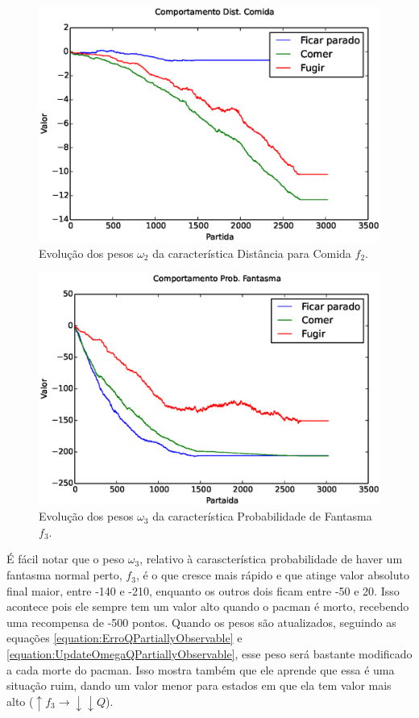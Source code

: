 \begin{figure}[H]
    \centering
    \includegraphics[width=\linewidth]{images/3_behaviors_small_map/weights____pol__DistComida}
    \caption{Evolução dos pesos $ \omega_2 $ da característica Distância para Comida $ f_2 $.}
    \label{img:3ComportamentosMapaPequeno:PesoDistComida}
\end{figure}

\begin{figure}[H]
    \centering
    \includegraphics[width=\linewidth]{images/3_behaviors_small_map/weights____pol__ProbFantasma}
    \caption{Evolução dos pesos $ \omega_3 $ da característica Probabilidade de Fantasma $ f_3 $.}
    \label{img:3ComportamentosMapaPequeno:PesoProbFantasma}
\end{figure}

É fácil notar que o peso $ \omega_3 $, relativo à carascterística probabilidade de haver um fantasma normal perto, $ f_3 $, é o que cresce mais rápido e que atinge valor absoluto final maior, entre -140 e -210, enquanto os outros dois ficam entre -50 e 20. Isso acontece pois ele sempre tem um valor alto quando o pacman é morto, recebendo uma recompensa de -500 pontos. Quando os pesos são atualizados, seguindo as equações \ref{equation:ErroQPartiallyObservable} e \ref{equation:UpdateOmegaQPartiallyObservable}, esse peso será bastante modificado a cada morte do pacman. Isso mostra também que ele aprende que essa é uma situação ruim, dando um valor menor para estados em que ela tem valor mais alto ($ \uparrow f_3 \rightarrow \downarrow \downarrow Q $).

